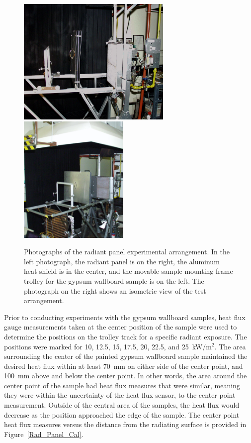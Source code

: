\documentclass[twoside]{uocthesis}
\begin{document}
{\begin{figure}
	\centering
	\includegraphics[width=2.92in]{../Figures/RAD_pan}
	\includegraphics[width=2.08in]{../Figures/RAD_pan_iso} \\
	\caption[Photographs of the radiant panel experimental arrangement]{Photographs of the radiant panel experimental arrangement.  In the left photograph, the radiant panel is on the right, the aluminum heat shield is in the center, and the movable sample mounting frame trolley for the gypsum wallboard sample is on the left.  The photograph on the right shows an isometric view of the test arrangement.}
	\label{Rad_Panel}
\end{figure}

Prior to conducting experiments with the gypsum wallboard samples, heat flux gauge measurements taken at the center position of the sample were used to determine the positions on the trolley track for a specific radiant exposure. The positions were marked for 10, 12.5, 15, 17.5, 20, 22.5, and 25~kW/m$^2$. The area surrounding the center of the painted gypsum wallboard sample maintained the desired heat flux within at least 70~mm on either side of the center point, and 100~mm above and below the center point.  In other words, the area around the center point of the sample had heat flux measures that were similar, meaning they were within the uncertainty of the heat flux sensor, to the center point measurement. Outside of the central area of the samples, the heat flux would decrease as the position approached the edge of the sample.  The center point heat flux measures versus the distance from the radiating surface is provided in Figure~\ref{Rad_Panel_Cal}.   

}
\end{document}
